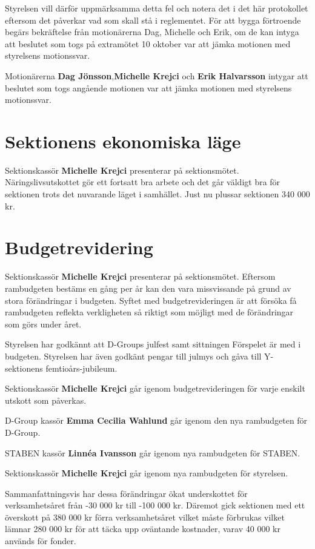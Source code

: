 \documentclass{datateknologsektionen-document}
\begin{document}
Styrelsen vill därför uppmärksamma detta fel och notera det i det här protokollet eftersom det påverkar vad som skall stå i reglementet. För att bygga förtroende begärs bekräftelse från motionärerna Dag, Michelle och Erik, om de kan intyga att beslutet som togs på extramötet 10 oktober var att jämka motionen med styrelsens motionssvar.

Motionärerna \textbf{Dag Jönsson},\textbf{Michelle Krejci} och \textbf{Erik Halvarsson} intygar att beslutet som togs angående motionen var att jämka motionen med styrelsens motionssvar.


\section{Sektionens ekonomiska läge}
Sektionskassör \textbf{Michelle Krejci} presenterar på sektionsmötet.
Näringslivsutskottet gör ett fortsatt bra arbete och det går väldigt bra för sektionen trots det nuvarande läget i samhället. Just nu plussar sektionen 340 000 kr.

\pagebreak
\section{Budgetrevidering}
Sektionskassör \textbf{Michelle Krejci} presenterar på sektionsmötet.
Eftersom rambudgeten bestäms en gång per år kan den vara missvissande på grund av stora förändringar i budgeten. Syftet med budgetrevideringen är att försöka få rambudgeten reflekta verkligheten så riktigt som möjligt med de förändringar som görs under året.

Styrelsen har godkännt att D-Groups julfest samt sittningen Förspelet är med i budgeten. Styrelsen har även godkänt pengar till julmys och gåva till Y-sektionens femtioårs-jubileum.

Sektionskassör \textbf{Michelle Krejci} går igenom budgetrevideringen för varje enskilt utskott som påverkas.

D-Group kassör \textbf{Emma Cecilia Wahlund} går igenom den nya rambudgeten för D-Group.

STABEN kassör \textbf{Linnéa Ivansson} går igenom nya rambudgeten för STABEN.

Sektionskassör \textbf{Michelle Krejci} går igenom nya rambudgeten för styrelsen.

Sammanfattningsvis har dessa förändringar ökat underskottet för verksamhetsåret från -30 000 kr till -100 000 kr. Däremot gick sektionen med ett överskott på 380 000 kr förra verksamhetsåret vilket måste förbrukas vilket lämnar 280 000 kr för att täcka upp oväntande kostnader, varav 40 000 kr används för fonder.
\end{document}
